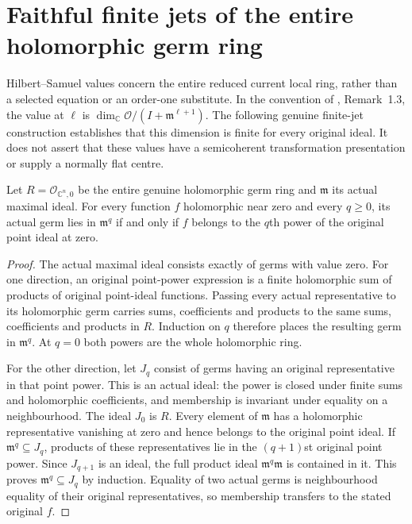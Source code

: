 \section{Faithful finite jets of the entire holomorphic germ ring}
\label{sec:hironaka-holomorphic-point-jets}

Hilbert--Samuel values concern the entire reduced current local ring, rather
than a selected equation or an order-one substitute. In the convention of
\cite{bierstone-milman97-invent-math}, Remark~1.3, the value at $\ell$ is
$\dim_{\mathbb C}\mathcal O/(I+\mathfrak m^{\ell+1})$. The following genuine
finite-jet construction establishes that this dimension is finite for every
original ideal. It does not assert that these values have a semicoherent
transformation presentation or supply a normally flat centre.

\begin{lemma}
\label{hir:whole-point-power-ring-dictionary}
\leanok
{}
Let $R=\mathcal O_{\mathbb C^n,0}$ be the entire genuine holomorphic germ
ring and $\mathfrak m$ its actual maximal ideal. For every function $f$
holomorphic near zero and every $q\ge0$, its actual germ lies in
$\mathfrak m^q$ if and only if $f$ belongs to the $q$th power of the original
point ideal at zero.
\end{lemma}
\begin{proof}
The actual maximal ideal consists exactly of germs with value zero. For
one direction, an original point-power expression is a finite holomorphic
sum of products of original point-ideal functions. Passing every actual
representative to its holomorphic germ carries sums, coefficients and
products to the same sums, coefficients and products in $R$. Induction on
$q$ therefore places the resulting germ in $\mathfrak m^q$. At $q=0$
both powers are the whole holomorphic ring.

For the other direction, let $J_q$ consist of germs having an original
representative in that point power. This is an actual ideal: the power is
closed under finite sums and holomorphic coefficients, and membership is
invariant under equality on a neighbourhood. The ideal $J_0$ is $R$.
Every element of $\mathfrak m$ has a holomorphic representative vanishing
at zero and hence belongs to the original point ideal. If
$\mathfrak m^q\subseteq J_q$, products of these representatives lie in the
$(q+1)$st original point power. Since $J_{q+1}$ is an ideal, the full product
ideal $\mathfrak m^q\mathfrak m$ is contained in it. This proves
$\mathfrak m^q\subseteq J_q$ by induction. Equality of two actual germs is
neighbourhood equality of their original representatives, so membership
transfers to the stated original $f$.
\end{proof}

